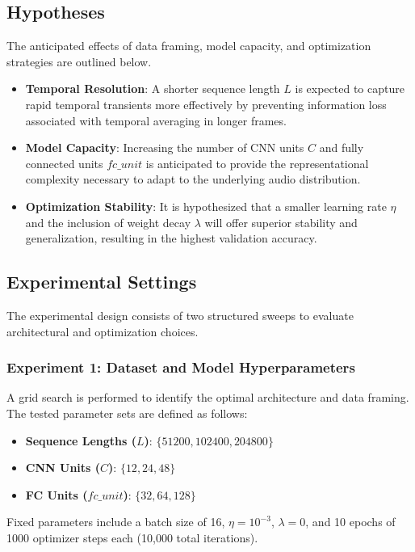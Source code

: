 \documentclass{article}
\begin{document}
\subsection{Hypotheses}
The anticipated effects of data framing, model capacity, and optimization strategies are outlined below.
\begin{itemize}
    \item \textbf{Temporal Resolution}: A shorter sequence length $L$ is expected to capture rapid temporal transients more effectively by preventing information loss associated with temporal averaging in longer frames.
    \item \textbf{Model Capacity}: Increasing the number of CNN units $C$ and fully connected units $fc\_unit$ is anticipated to provide the representational complexity necessary to adapt to the underlying audio distribution.
    \item \textbf{Optimization Stability}: It is hypothesized that a smaller learning rate $\eta$ and the inclusion of weight decay $\lambda$ will offer superior stability and generalization, resulting in the highest validation accuracy.
\end{itemize}

\subsection{Experimental Settings}
The experimental design consists of two structured sweeps to evaluate architectural and optimization choices.

\subsubsection{Experiment 1: Dataset and Model Hyperparameters}
A grid search is performed to identify the optimal architecture and data framing. The tested parameter sets are defined as follows:
\begin{itemize}
    \item \textbf{Sequence Lengths ($L$)}: $\{51200, 102400, 204800\}$
    \item \textbf{CNN Units ($C$)}: $\{12, 24, 48\}$
    \item \textbf{FC Units ($fc\_unit$)}: $\{32, 64, 128\}$
\end{itemize}
Fixed parameters include a batch size of 16, $\eta = 10^{-3}$, $\lambda = 0$, and 10 epochs of 1000 optimizer steps each (10{,}000 total iterations).
\end{document}
